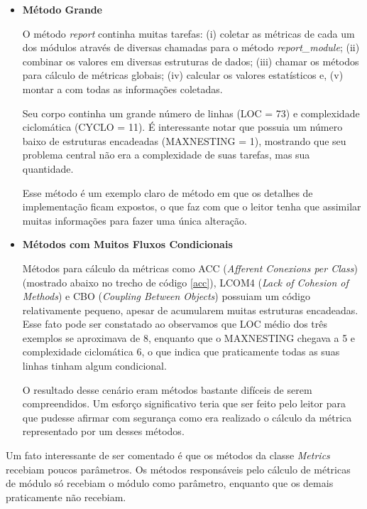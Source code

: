\begin{itemize}
\item 
\textbf{Método Grande}

O método \textit{report} continha muitas tarefas: (i) coletar as métricas de cada um dos módulos
através de diversas chamadas para o método \textit{report\_module}; (ii) combinar os valores em 
diversas estruturas de dados; (iii) chamar os métodos para cálculo de métricas globais; (iv)
calcular os valores estatísticos e, (v) montar a com todas as informações coletadas.

Seu corpo continha um grande número de linhas (LOC = 73) e complexidade ciclomática (CYCLO = 11).
É interessante notar que possuia um número baixo de estruturas encadeadas (MAXNESTING = 1), mostrando
que seu problema central não era a complexidade de suas tarefas, mas sua quantidade.

Esse método é um exemplo claro de método em que os detalhes de implementação ficam expostos, o que 
faz com que o leitor tenha que assimilar muitas informações para fazer uma única alteração.

\item
\textbf{Métodos com Muitos Fluxos Condicionais}

Métodos para cálculo da métricas como ACC (\textit{Afferent Conexions per Class}) (mostrado abaixo
no trecho de código \ref{acc}), LCOM4 (\textit{Lack of Cohesion of Methods}) e CBO
(\textit{Coupling Between Objects}) possuiam um código relativamente pequeno, apesar de acumularem muitas 
estruturas encadeadas. Esse fato pode ser constatado ao observamos que LOC médio dos três exemplos se 
aproximava de 8, enquanto que o MAXNESTING chegava a 5 e complexidade ciclomática 6, o que indica que
praticamente todas as suas linhas tinham algum condicional.

O resultado desse cenário eram métodos bastante difíceis de serem compreendidos. 
Um esforço significativo teria que ser feito pelo leitor para que  pudesse afirmar
com segurança como era realizado o cálculo da métrica representado por um desses
métodos.



\end{itemize}

Um fato interessante de ser comentado é que os métodos da classe \textit{Metrics}
recebiam poucos parâmetros. Os métodos responsáveis pelo cálculo de métricas de módulo
só recebiam o módulo como parâmetro, enquanto que os demais praticamente não recebiam.


